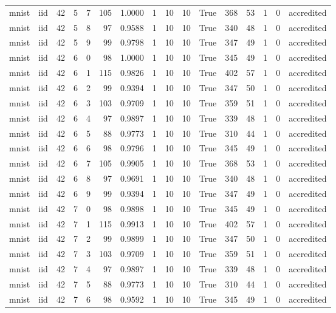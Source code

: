 \begin{tabular}{llrrrrrrrrrrrrrl}
mnist & iid & 42 & 5 & 7 & 105 & 1.0000 & 1 & 10 & 10 & True & 368 & 53 & 1 & 0 & accredited \\
mnist & iid & 42 & 5 & 8 & 97 & 0.9588 & 1 & 10 & 10 & True & 340 & 48 & 1 & 0 & accredited \\
mnist & iid & 42 & 5 & 9 & 99 & 0.9798 & 1 & 10 & 10 & True & 347 & 49 & 1 & 0 & accredited \\
mnist & iid & 42 & 6 & 0 & 98 & 1.0000 & 1 & 10 & 10 & True & 345 & 49 & 1 & 0 & accredited \\
mnist & iid & 42 & 6 & 1 & 115 & 0.9826 & 1 & 10 & 10 & True & 402 & 57 & 1 & 0 & accredited \\
mnist & iid & 42 & 6 & 2 & 99 & 0.9394 & 1 & 10 & 10 & True & 347 & 50 & 1 & 0 & accredited \\
mnist & iid & 42 & 6 & 3 & 103 & 0.9709 & 1 & 10 & 10 & True & 359 & 51 & 1 & 0 & accredited \\
mnist & iid & 42 & 6 & 4 & 97 & 0.9897 & 1 & 10 & 10 & True & 339 & 48 & 1 & 0 & accredited \\
mnist & iid & 42 & 6 & 5 & 88 & 0.9773 & 1 & 10 & 10 & True & 310 & 44 & 1 & 0 & accredited \\
mnist & iid & 42 & 6 & 6 & 98 & 0.9796 & 1 & 10 & 10 & True & 345 & 49 & 1 & 0 & accredited \\
mnist & iid & 42 & 6 & 7 & 105 & 0.9905 & 1 & 10 & 10 & True & 368 & 53 & 1 & 0 & accredited \\
mnist & iid & 42 & 6 & 8 & 97 & 0.9691 & 1 & 10 & 10 & True & 340 & 48 & 1 & 0 & accredited \\
mnist & iid & 42 & 6 & 9 & 99 & 0.9394 & 1 & 10 & 10 & True & 347 & 49 & 1 & 0 & accredited \\
mnist & iid & 42 & 7 & 0 & 98 & 0.9898 & 1 & 10 & 10 & True & 345 & 49 & 1 & 0 & accredited \\
mnist & iid & 42 & 7 & 1 & 115 & 0.9913 & 1 & 10 & 10 & True & 402 & 57 & 1 & 0 & accredited \\
mnist & iid & 42 & 7 & 2 & 99 & 0.9899 & 1 & 10 & 10 & True & 347 & 50 & 1 & 0 & accredited \\
mnist & iid & 42 & 7 & 3 & 103 & 0.9709 & 1 & 10 & 10 & True & 359 & 51 & 1 & 0 & accredited \\
mnist & iid & 42 & 7 & 4 & 97 & 0.9897 & 1 & 10 & 10 & True & 339 & 48 & 1 & 0 & accredited \\
mnist & iid & 42 & 7 & 5 & 88 & 0.9773 & 1 & 10 & 10 & True & 310 & 44 & 1 & 0 & accredited \\
mnist & iid & 42 & 7 & 6 & 98 & 0.9592 & 1 & 10 & 10 & True & 345 & 49 & 1 & 0 & accredited \\

\end{tabular}
